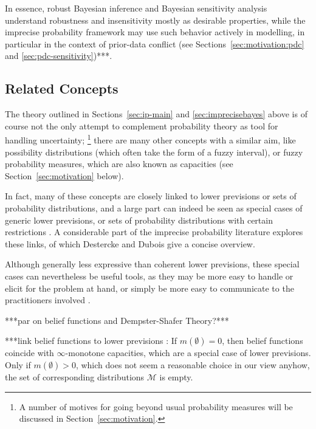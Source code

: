 In essence, robust Bayesian inference and Bayesian sensitivity analysis
understand robustness and insensitivity mostly as desirable properties,
while the imprecise probability framework may use such behavior actively in modelling,
in particular in the context of prior-data conflict
(see Sections~\ref{sec:motivation:pdc} and \ref{sec:pdc-sensitivity})***.


\subsection{Related Concepts}

The theory outlined in Sections~\ref{sec:ip-main} and \ref{sec:imprecisebayes} above
is of course not the only attempt to complement probability theory as tool for handling uncertainty;%
\footnote{A number of motives for going beyond usual probability measures will be discussed in Section~\ref{sec:motivation}.}
there are many other concepts with a similar aim,
like possibility distributions (which often take the form of a fuzzy interval),
or fuzzy probability measures, which are also known as capacities (see Section~\ref{sec:motivation} below).

In fact, many of these concepts are closely linked to
lower previsions or sets of probability distributions,
and a large part can indeed be seen as special cases of generic lower previsions, 
or sets of probability distributions with certain restrictions
\parencite[Fig.~5.5]{itip-special}.
A considerable part of the imprecise probability literature
explores these links, of which Destercke and Dubois \parencite*{itip-other,itip-special}
give a concise overview.


Although generally less expressive than coherent lower previsions,
these special cases can nevertheless be useful tools,
as they may be more easy to handle or elicit for the problem at hand,
or simply be more easy to communicate to the practitioners involved
\parencite[\S 1]{itip-special}.


***par on belief functions and Dempster-Shafer Theory?*** \parencite[\S 2]{itip-other}

***link belief functions to lower previsions \parencite[\S 2.1, p~126]{itip-other}:
If $m(\emptyset) = 0$, then belief functions coincide with $\infty$-monotone capacities,
which are a special case of lower previsions.
Only if $m(\emptyset) > 0$, which does not seem a reasonable choice in our view anyhow,
the set of corresponding distributions $\mathcal{M}$ is empty.

